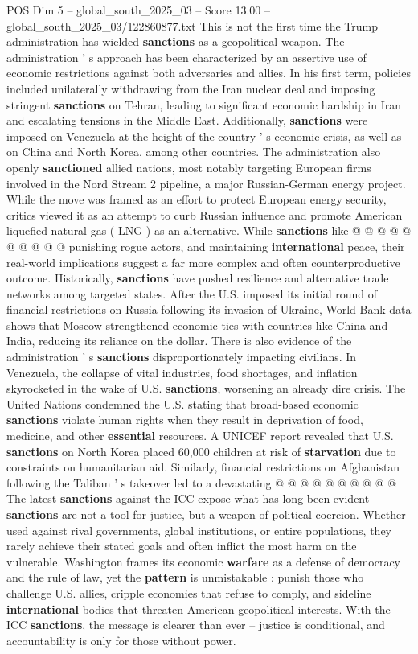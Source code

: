 \begin{textsample}{POS Dim 5 – global\_south\_2025\_03 – Score 13.00 – global\_south\_2025\_03/122860877.txt}
This is not the first time the Trump administration has wielded \textbf{sanctions} as a geopolitical weapon.
The administration ' s approach has been characterized by an assertive use of economic restrictions against both adversaries and allies.
In his first term, policies included unilaterally withdrawing from the Iran nuclear deal and imposing stringent \textbf{sanctions} on Tehran, leading to significant economic hardship in Iran and escalating tensions in the Middle East.
Additionally, \textbf{sanctions} were imposed on Venezuela at the height of the country ' s economic crisis, as well as on China and North Korea, among other countries.
The administration also openly \textbf{sanctioned} allied nations, most notably targeting European firms involved in the Nord Stream 2 pipeline, a major Russian-German energy project.
While the move was framed as an effort to protect European energy security, critics viewed it as an attempt to curb Russian influence and promote American liquefied natural gas ( LNG ) as an alternative.
While \textbf{sanctions} like @ @ @ @ @ @ @ @ @ @ punishing rogue actors, and maintaining \textbf{international} peace, their real-world implications suggest a far more complex and often counterproductive outcome.
Historically, \textbf{sanctions} have pushed resilience and alternative trade networks among targeted states.
After the U.S. imposed its initial round of financial restrictions on Russia following its invasion of Ukraine, World Bank data shows that Moscow strengthened economic ties with countries like China and India, reducing its reliance on the dollar.
There is also evidence of the administration ' s \textbf{sanctions} disproportionately impacting civilians.
In Venezuela, the collapse of vital industries, food shortages, and inflation skyrocketed in the wake of U.S. \textbf{sanctions}, worsening an already dire crisis.
The United Nations condemned the U.S. stating that broad-based economic \textbf{sanctions} violate human rights when they result in deprivation of food, medicine, and other \textbf{essential} resources.
A UNICEF report revealed that U.S. \textbf{sanctions} on North Korea placed 60,000 children at risk of \textbf{starvation} due to constraints on humanitarian aid.
Similarly, financial restrictions on Afghanistan following the Taliban ' s takeover led to a devastating @ @ @ @ @ @ @ @ @ @ The latest \textbf{sanctions} against the ICC expose what has long been evident -- \textbf{sanctions} are not a tool for justice, but a weapon of political coercion.
Whether used against rival governments, global institutions, or entire populations, they rarely achieve their stated goals and often inflict the most harm on the vulnerable.
Washington frames its economic \textbf{warfare} as a defense of democracy and the rule of law, yet the \textbf{pattern} is unmistakable : punish those who challenge U.S. allies, cripple economies that refuse to comply, and sideline \textbf{international} bodies that threaten American geopolitical interests.
With the ICC \textbf{sanctions}, the message is clearer than ever -- justice is conditional, and accountability is only for those without power.


\end{textsample}
